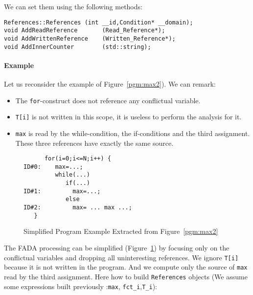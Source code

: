 We can set them using the following methods:

\begin{lstlisting}[frame=single,framerule=0pt]
     References::References (int __id,Condition* __domain);
void AddReadReference       (Read_Reference*);
void AddWrittenReference    (Written_Reference*);
void AddInnerCounter        (std::string);
\end{lstlisting}


\paragraph{Example}

Let us reconsider the example of Figure~\ref{pgm:max2}). We can remark:

\begin{itemize}
\item The \verb|for|-construct  does not reference any conflictual variable.
\item \verb|T[i]| is not written in this scope, it is useless to perform the analysis for it.
\item \verb|max| is read by the while-condition, the if-conditions and the third assignment. These three references have exactly the same source.
\end{itemize}


\begin{figure}[!h]
 \begin{verbatim}
      for(i=0;i<=N;i++) {
ID#0:    max=...;
         while(...)
            if(...)
ID#1:         max=...;
            else
ID#2:         max= ... max ...;
   }
 \end{verbatim}
\caption{Simplified Program Example Extracted from Figure~\ref{pgm:max2}}
\label{pgm:simplified_max}
\end{figure}

The FADA processing can be simplified (Figure~\ref{pgm:simplified_max}) by focusing only on the conflictual variables and dropping all uninteresting references. We ignore \verb|T[i]| because it is not written in the program. And we compute only the source of \verb|max| read by the third assignment.
Here how to build \verb|References| objects (We assume some expressions built previously :\verb|max|, \verb|fct_i|,\verb|T_i|):


